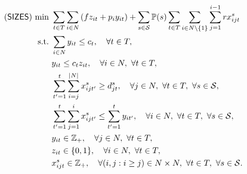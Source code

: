 
\begin{subequations} \label{sizes:formulation}
	\begin{align}
	(\textsf{SIZES})\ \textrm{min}\ &\sum_{t\in T}\sum_{i\in N} \left(fz_{it} + p_i y_{it} \right) + 
	\sum_{s\in \mathcal{S}} \operatorname*{\mathbb{P}}(s)\sum_{t\in T}\sum_{i\in N\backslash\{1\}}\sum_{j=1}^{i-1}rx_{ijt}^s \label{sizes:obj}\\
	\textrm{s.t.}\ &\sum_{i\in N}y_{it}\le c_{t},\quad \forall t\in T, \label{sizes:b}\\
	&y_{it}\le c_{t} z_{it},\quad\forall i \in N,\ \forall t\in T,\label{sizes:c}\\
	&\sum_{t'=1}^{t}\sum_{i=j}^{|N|} x_{ijt'}^s \ge d_{jt}^s,\quad\forall j\in N,\ \forall t\in T,\  \forall s\in \mathcal{S},\label{sizes:d}\\
	&\sum_{t'=1}^{t}\sum_{j=1}^{i}x_{ijt'}^s\le\sum_{t'=1}^{t}y_{it'}, \quad\forall i\in N,\ \forall t\in T,\ \forall s\in \mathcal{S},\label{sizes:e}\\
	&y_{it}\in\mathbb{Z}_+,\quad \forall j\in N,\ \forall t\in T,\label{sizes:f}\\
	&z_{it}\in\{0,1\},\quad\forall i\in N,\ \forall t\in T,\label{sizes:g}\\
	&x_{ijt}^s\in\mathbb{Z}_+,\quad\forall (i,j:i\ge j)\in N\times N,\ \forall t\in T,\ \forall s\in \mathcal{S}.\label{sizes:h}
	\end{align}
\end{subequations}

